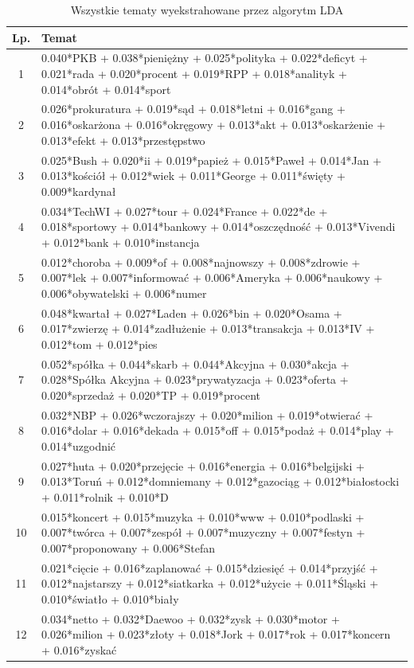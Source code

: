 \documentclass[11pt,a4paper]{article}
\begin{document}
\begin{table}[h]
\caption{Wszystkie tematy wyekstrahowane przez algorytm LDA}
\begin{tabular}{|c|>{\footnotesize}p{\linewidth}|}
\hline
Lp. & Temat \\\hline

1 & 0.040*PKB + 0.038*pieniężny + 0.025*polityka + 0.022*deficyt + 0.021*rada + 0.020*procent + 0.019*RPP + 0.018*analityk + 0.014*obrót + 0.014*sport\\\hline
2 & 0.026*prokuratura + 0.019*sąd + 0.018*letni + 0.016*gang + 0.016*oskarżona + 0.016*okręgowy + 0.013*akt + 0.013*oskarżenie + 0.013*efekt + 0.013*przestępstwo\\\hline
3 & 0.025*Bush + 0.020*ii + 0.019*papież + 0.015*Paweł + 0.014*Jan + 0.013*kościół + 0.012*wiek + 0.011*George + 0.011*święty + 0.009*kardynał\\\hline
4 & 0.034*TechWI + 0.027*tour + 0.024*France + 0.022*de + 0.018*sportowy + 0.014*bankowy + 0.014*oszczędność + 0.013*Vivendi + 0.012*bank + 0.010*instancja\\\hline
5 & 0.012*choroba + 0.009*of + 0.008*najnowszy + 0.008*zdrowie + 0.007*lek + 0.007*informować + 0.006*Ameryka + 0.006*naukowy + 0.006*obywatelski + 0.006*numer\\\hline
6 & 0.048*kwartał + 0.027*Laden + 0.026*bin + 0.020*Osama + 0.017*zwierzę + 0.014*zadłużenie + 0.013*transakcja + 0.013*IV + 0.012*tom + 0.012*pies\\\hline
7 & 0.052*spółka + 0.044*skarb + 0.044*Akcyjna + 0.030*akcja + 0.028*Spółka Akcyjna + 0.023*prywatyzacja + 0.023*oferta + 0.020*sprzedaż + 0.020*TP + 0.019*procent\\\hline
8 & 0.032*NBP + 0.026*wczorajszy + 0.020*milion + 0.019*otwierać + 0.016*dolar + 0.016*dekada + 0.015*off + 0.015*podaż + 0.014*play + 0.014*uzgodnić\\\hline
9 & 0.027*huta + 0.020*przejęcie + 0.016*energia + 0.016*belgijski + 0.013*Toruń + 0.012*domniemany + 0.012*gazociąg + 0.012*białostocki + 0.011*rolnik + 0.010*D\\\hline
10 & 0.015*koncert + 0.015*muzyka + 0.010*www + 0.010*podlaski + 0.007*twórca + 0.007*zespół + 0.007*muzyczny + 0.007*festyn + 0.007*proponowany + 0.006*Stefan\\\hline
11 & 0.021*cięcie + 0.016*zaplanować + 0.015*dziesięć + 0.014*przyjść + 0.012*najstarszy + 0.012*siatkarka + 0.012*użycie + 0.011*Śląski + 0.010*światło + 0.010*biały\\\hline
12 & 0.034*netto + 0.032*Daewoo + 0.032*zysk + 0.030*motor + 0.026*milion + 0.023*złoty + 0.018*Jork + 0.017*rok + 0.017*koncern + 0.016*zyskać\\\hline

\end{tabular}
\end{table}
\end{document}
